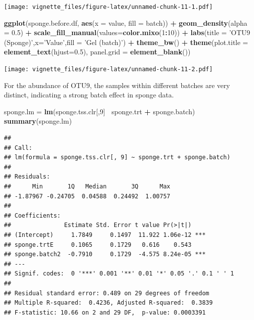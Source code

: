 \documentclass[]{book}
\newenvironment{Shaded}{\begin{snugshade}}{\end{snugshade}}
\newcommand{\KeywordTok}[1]{\textcolor[rgb]{0.13,0.29,0.53}{\textbf{#1}}}
\newcommand{\DataTypeTok}[1]{\textcolor[rgb]{0.13,0.29,0.53}{#1}}
\newcommand{\DecValTok}[1]{\textcolor[rgb]{0.00,0.00,0.81}{#1}}
\newcommand{\FloatTok}[1]{\textcolor[rgb]{0.00,0.00,0.81}{#1}}
\newcommand{\StringTok}[1]{\textcolor[rgb]{0.31,0.60,0.02}{#1}}
\newcommand{\OperatorTok}[1]{\textcolor[rgb]{0.81,0.36,0.00}{\textbf{#1}}}
\newcommand{\NormalTok}[1]{#1}
\begin{document}
\texttt{[image: vignette\_files/figure-latex/unnamed-chunk-11-1.pdf]}

\begin{Shaded}
\begin{Highlighting}[]
\KeywordTok{ggplot}\NormalTok{(sponge.before.df, }\KeywordTok{aes}\NormalTok{(}\DataTypeTok{x =}\NormalTok{ value, }\DataTypeTok{fill =}\NormalTok{ batch)) }\OperatorTok{+}\StringTok{ }\KeywordTok{geom_density}\NormalTok{(}\DataTypeTok{alpha =} \FloatTok{0.5}\NormalTok{) }\OperatorTok{+}\StringTok{ }\KeywordTok{scale_fill_manual}\NormalTok{(}\DataTypeTok{values=}\KeywordTok{color.mixo}\NormalTok{(}\DecValTok{1}\OperatorTok{:}\DecValTok{10}\NormalTok{)) }\OperatorTok{+}\StringTok{ }\KeywordTok{labs}\NormalTok{(}\DataTypeTok{title =} \StringTok{'OTU9 (Sponge)'}\NormalTok{,}\DataTypeTok{x=}\StringTok{'Value'}\NormalTok{,}\DataTypeTok{fill =} \StringTok{'Gel (batch)'}\NormalTok{) }\OperatorTok{+}\StringTok{ }\KeywordTok{theme_bw}\NormalTok{() }\OperatorTok{+}\StringTok{ }\KeywordTok{theme}\NormalTok{(}\DataTypeTok{plot.title =} \KeywordTok{element_text}\NormalTok{(}\DataTypeTok{hjust=}\FloatTok{0.5}\NormalTok{), }\DataTypeTok{panel.grid =} \KeywordTok{element_blank}\NormalTok{())}
\end{Highlighting}
\end{Shaded}

\texttt{[image: vignette\_files/figure-latex/unnamed-chunk-11-2.pdf]}

For the abundance of OTU9, the samples within different batches are very
distinct, indicating a strong batch effect in sponge data.

\begin{Shaded}
\begin{Highlighting}[]
\NormalTok{sponge.lm =}\StringTok{ }\KeywordTok{lm}\NormalTok{(sponge.tss.clr[,}\DecValTok{9}\NormalTok{]}\OperatorTok{~}\StringTok{ }\NormalTok{sponge.trt }\OperatorTok{+}\StringTok{ }\NormalTok{sponge.batch)}
\KeywordTok{summary}\NormalTok{(sponge.lm)}
\end{Highlighting}
\end{Shaded}

\begin{verbatim}
## 
## Call:
## lm(formula = sponge.tss.clr[, 9] ~ sponge.trt + sponge.batch)
## 
## Residuals:
##      Min       1Q   Median       3Q      Max 
## -1.87967 -0.24705  0.04588  0.24492  1.00757 
## 
## Coefficients:
##               Estimate Std. Error t value Pr(>|t|)    
## (Intercept)     1.7849     0.1497  11.922 1.06e-12 ***
## sponge.trtE     0.1065     0.1729   0.616    0.543    
## sponge.batch2  -0.7910     0.1729  -4.575 8.24e-05 ***
## ---
## Signif. codes:  0 '***' 0.001 '**' 0.01 '*' 0.05 '.' 0.1 ' ' 1
## 
## Residual standard error: 0.489 on 29 degrees of freedom
## Multiple R-squared:  0.4236, Adjusted R-squared:  0.3839 
## F-statistic: 10.66 on 2 and 29 DF,  p-value: 0.0003391
\end{verbatim}
\end{document}
